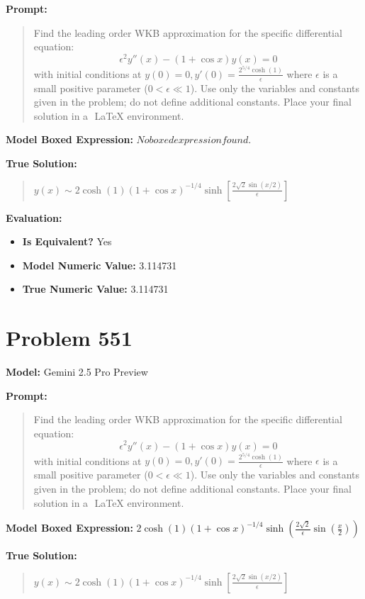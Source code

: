 \documentclass{article}
\begin{document}
\textbf{Prompt:}
\begin{quote}
Find the leading order WKB approximation for the specific differential equation: $$ \epsilon^2 y''(x) - (1+\cos{x}) y(x) = 0 $$ with initial conditions at $y(0) = 0, y'(0) = \frac{2^{5/4} \cosh{(1)}}{\epsilon}$ where $\epsilon$ is a small positive parameter ($0 < \epsilon \ll 1$). Use only the variables and constants given in the problem; do not define additional constants. Place your final solution in a $\boxed{}$ LaTeX environment.
\end{quote}
\textbf{Model Boxed Expression:} $No boxed expression found.$

\textbf{True Solution:}
\begin{quote}
$y(x) \sim 2\cosh(1) (1+\cos x)^{-1/4}\sinh\left[\frac{2\sqrt{2}\sin(x/2)}{\epsilon}\right]$
\end{quote}

\textbf{Evaluation:}
\begin{itemize}
\item \textbf{Is Equivalent?} Yes
\item \textbf{Model Numeric Value:} 3.114731
\item \textbf{True Numeric Value:} 3.114731
\end{itemize}
\vspace{1cm}
\section*{Problem 551}
\textbf{Model:} Gemini 2.5 Pro Preview

\textbf{Prompt:}
\begin{quote}
Find the leading order WKB approximation for the specific differential equation: $$ \epsilon^2 y''(x) - (1+\cos{x}) y(x) = 0 $$ with initial conditions at $y(0) = 0, y'(0) = \frac{2^{5/4} \cosh{(1)}}{\epsilon}$ where $\epsilon$ is a small positive parameter ($0 < \epsilon \ll 1$). Use only the variables and constants given in the problem; do not define additional constants. Place your final solution in a $\boxed{}$ LaTeX environment.
\end{quote}
\textbf{Model Boxed Expression:} $2 \cosh(1) (1+\cos x)^{-1/4} \sinh\left(\frac{2\sqrt{2}}{\epsilon} \sin\left(\frac{x}{2}\right)\right)$

\textbf{True Solution:}
\begin{quote}
$y(x) \sim 2\cosh(1) (1+\cos x)^{-1/4}\sinh\left[\frac{2\sqrt{2}\sin(x/2)}{\epsilon}\right]$
\end{quote}
\end{document}
